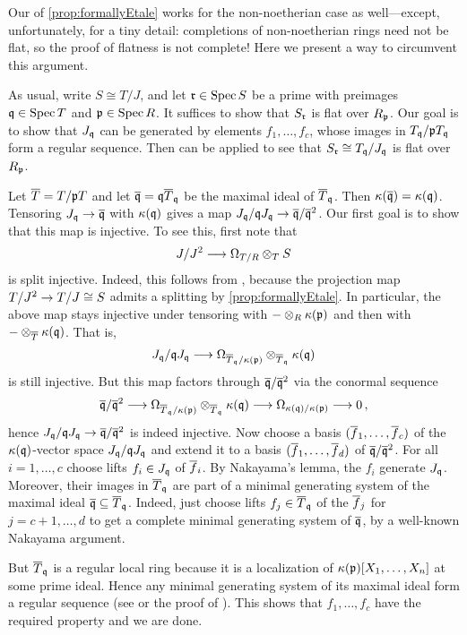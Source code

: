 \begin{rem*}
	Our  of \cref{prop:formallyEtale} works for the non-noetherian case as well---except, unfortunately, for a tiny detail: completions of non-noetherian rings need not be flat, so the proof of flatness is not complete! Here we present a way to circumvent this argument.
	
	As usual, write $S\cong T/J$, and let $\mathfrak{r}\in \operatorname{Spec} S$ be a prime with preimages $\mathfrak{q}\in \operatorname{Spec} T$ and $\mathfrak{p}\in \operatorname{Spec} R$. It suffices to show that $S_{\mathfrak{r}}$ is flat over $R_{\mathfrak{p}}$. Our goal is to show that $J_{\mathfrak{q}}$ can be generated by elements $f_1,\dotsc,f_c$, whose images in $T_{\mathfrak{q}}/\mathfrak{p} T_{\mathfrak{q}}$ form a regular sequence. Then \cite[]{stacks-project} can be applied to see that $S_{\mathfrak{r}}\cong T_{\mathfrak{q}}/J_{\mathfrak{q}}$ is flat over $R_{\mathfrak{p}}$.
	
	Let $\ov{T}=T/\pp T$ and let $\ov{\qq}=\qq\ov{T}_\qq$ be the maximal ideal of $\ov{T}_\qq$. Then $\kappa(\ov{\qq})=\kappa(\qq)$. Tensoring $J_\qq\morphism \ov{\qq}$ with $\kappa(\mathfrak{q})$ gives a map $J_\qq/\qq J_\qq\morphism\ov{\qq}/\ov{\qq}^2$. Our first goal is to show that this map is injective. To see this, first note that
	\begin{equation*}
		J/J^2\morphism\Omega_{T/R}\otimes_TS
	\end{equation*}
	is split injective. Indeed, this follows from \cite[Proposition~16.12]{eisenbudCommAlg}, because the projection map $T/J^2\morphism T/J\cong S$ admits a splitting by \cref{prop:formallyEtale}. In particular, the above map stays injective under tensoring with $-\otimes_R\kappa(\mathfrak{p})$ and then with $-\otimes_{\ov{T}}\kappa(\qq)$. That is,
	\begin{equation*}
		J_\qq/\qq J_\qq\morphism\Omega_{\ov{T}_\qq/\kappa(\pp)}\otimes_{\ov{T}_\qq}\kappa(\qq)
	\end{equation*}
	is still injective. But this map factors through $\ov{\qq}/\ov{\qq}^2$ via the conormal sequence
	\begin{equation*}
		\ov{\qq}/\ov{\qq}^2\morphism\Omega_{\ov{T}_\qq/\kappa(\pp)}\otimes_{\ov{T}_\qq}\kappa(\qq)\morphism\Omega_{\kappa(\qq)/\kappa(\pp)}\morphism 0\,,
	\end{equation*}
	hence $J_\qq/\qq J_\qq\morphism \ov{\qq}/\ov{\qq}^2$ is indeed injective. Now choose a basis $(\ov{f}_1,\dotsc,\ov{f}_c)$ of the $\kappa(\mathfrak{q})$-vector space $J_{\mathfrak{q}}/\mathfrak{q} J_{\mathfrak{q}}$ and extend it to a basis $(\ov{f}_1,\dotsc,\ov{f}_d)$ of $\ov{\qq}/\ov{\qq}^2$. For all $i=1,\dotsc,c$ choose lifts $f_i\in J_{\mathfrak{q}}$ of $\ov{f}_i$. By Nakayama's lemma, the $f_i$ generate $J_{\mathfrak{q}}$. Moreover, their images in $\ov{T}_\qq$ are part of a minimal generating system of the maximal ideal $\ov{\qq}\subseteq \ov{T}_\qq$. Indeed, just choose lifts $f_j\in \ov{T}_\qq$ of the $\ov{f}_j$ for $j=c+1,\dotsc,d$ to get a complete minimal generating system of $\ov{\qq}$, by a well-known Nakayama argument.
	
	But $\ov{T}_\qq$ is a regular local ring because it is a localization of $\kappa(\mathfrak{p})[X_1,\dotsc,X_n]$ at some prime ideal. Hence any minimal generating system of its maximal ideal form a regular sequence (see \cite[]{stacks-project} or the proof of \cite[Proposition~2.2.1]{homalg}). This shows that $f_1,\dotsc,f_c$ have the required property and we are done.
\end{rem*}
